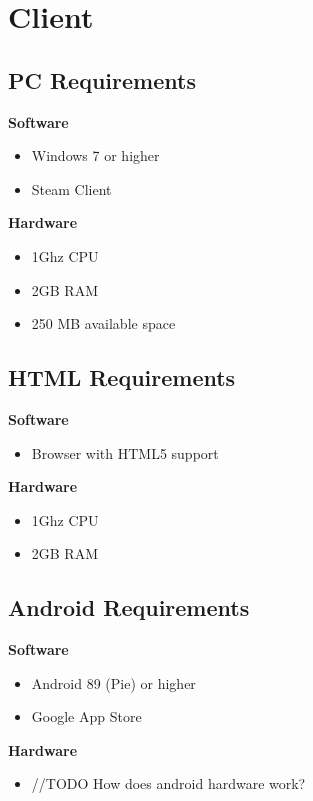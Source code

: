 \section{Client}

\subsection{PC Requirements}

\textbf{Software}

\begin {itemize}	
	\item Windows 7 or higher
	\item Steam Client
\end {itemize}

\textbf{Hardware}

\begin {itemize}	
	\item 1Ghz CPU
	\item 2GB RAM
	\item 250 MB available space
\end {itemize}

\subsection{HTML Requirements}

\textbf{Software}

\begin {itemize}	
	\item Browser with HTML5 support
\end {itemize}

\textbf{Hardware}

\begin {itemize}	
	\item 1Ghz CPU
	\item 2GB RAM
\end {itemize}

\subsection{Android Requirements}

\textbf{Software}

\begin {itemize}	
	\item Android 89 (Pie) or higher
	\item Google App Store
\end {itemize}

\textbf{Hardware}

\begin {itemize}	
	\item //TODO How does android hardware work?
\end {itemize}

\pagebreak 